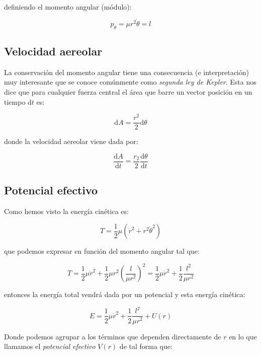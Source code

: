 \documentclass[12pt,a4paper]{book}
\newcommand{\parentesis}[1]{\left( #1  \right)}
\newcommand{\D}{\mathrm{d}}
\begin{document}
definiendo el momento angular (módulo):

\begin{equation}
p_\theta  = \mu r^2 \dot{\theta} = l
\end{equation}

\subsection{Velocidad aereolar}

La conservación del momento angular tiene una consecuencia (e interpretación) muy interesante que se conoce comúnmente como \textit{segunda ley de Kepler}. Esta nos dice que para cualquier fuerza central el área que barre un vector posición en un tiempo $\D t$ es:

\begin{equation}
\D A = \dfrac{r^2}{2} \D \theta
\end{equation}

donde la velocidad aereolar viene dada por:

\begin{equation}
\dfrac{\D A}{\D t} = \dfrac{r_2}{2} \dfrac{\D \theta}{\D t}
\end{equation}


\subsection{Potencial efectivo}

Como hemos visto la energía cinética es:

\begin{equation}
T =  \frac{1}{2} \mu (\dot{r}^2 + r^2 \dot{\theta}^2 ) 
\end{equation}

que podemos expresar en función del momento angular tal que:

\begin{equation}
T =  \frac{1}{2} \mu \dot{r}^2 + \dfrac{1}{2} \mu r^2 \parentesis{\dfrac{l}{\mu r^2}}^2  = \frac{1}{2} \mu \dot{r}^2 + \dfrac{1}{2} \dfrac{l^2}{\mu r^2}
\end{equation}

entonces la energía total vendrá dada por un potencial y esta energía cinética:

\begin{equation}
E =  \frac{1}{2} \mu \dot{r}^2 + \dfrac{1}{2} \dfrac{l^2}{\mu r^2} + U(r)
\end{equation}

Donde podemos agrupar a los términos que dependen directamente de $r$ en lo que llamamos el \textit{potencial efectivo} $V(r)$ de tal forma que:
\end{document}
